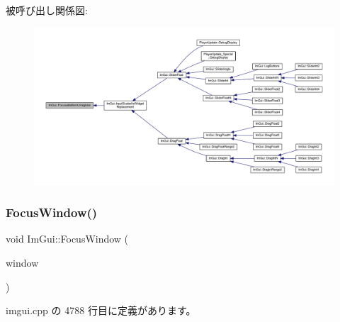 被呼び出し関係図\+:\nopagebreak
\begin{figure}[H]
\begin{center}
\leavevmode
\includegraphics[width=350pt]{namespace_im_gui_a390518fcaef04b4d399d2475d4d84df7_icgraph}
\end{center}
\end{figure}
\mbox{\label{namespace_im_gui_ade4c08e7e7ad7bbfa4835248f5f3a7c6}} 
\subsubsection{\texorpdfstring{Focus\+Window()}{FocusWindow()}}
{\footnotesize\ttfamily void Im\+Gui\+::\+Focus\+Window (\begin{DoxyParamCaption}\item[{\mbox{\hyperlink{struct_im_gui_window}{Im\+Gui\+Window}} $\ast$}]{window }\end{DoxyParamCaption})}



 imgui.\+cpp の 4788 行目に定義があります。

